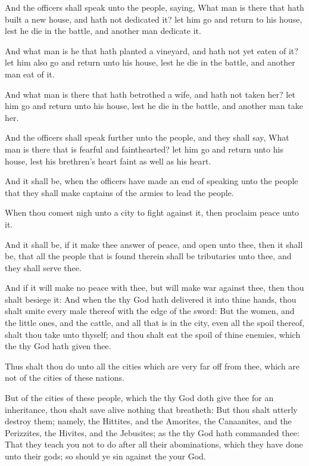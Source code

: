 \Verse And the officers shall speak unto the people, saying, What man is there that hath built a new house, and hath not dedicated it? let him go and return to his house, lest he die in the battle, and another man dedicate it.

\Verse And what man is he that hath planted a vineyard, and hath not yet eaten of it? let him also go and return unto his house, lest he die in the battle, and another man eat of it.

\Verse And what man is there that hath betrothed a wife, and hath not taken her? let him go and return unto his house, lest he die in the battle, and another man take her.

\Verse And the officers shall speak further unto the people, and they shall say, What man is there that is fearful and fainthearted? let him go and return unto his house, lest his brethren's heart faint as well as his heart.

\Verse And it shall be, when the officers have made an end of speaking unto the people that they shall make captains of the armies to lead the people.

\Verse When thou comest nigh unto a city to fight against it, then proclaim peace unto it.

\Verse And it shall be, if it make thee answer of peace, and open unto thee, then it shall be, that all the people that is found therein shall be tributaries unto thee, and they shall serve thee.

\Verse And if it will make no peace with thee, but will make war against thee, then thou shalt besiege it: \Verse And when the \LORD thy God hath delivered it into thine hands, thou shalt smite every male thereof with the edge of the sword: \Verse But the women, and the little ones, and the cattle, and all that is in the city, even all the spoil thereof, shalt thou take unto thyself; and thou shalt eat the spoil of thine enemies, which the \LORD thy God hath given thee.

\Verse Thus shalt thou do unto all the cities which are very far off from thee, which are not of the cities of these nations.

\Verse But of the cities of these people, which the \LORD thy God doth give thee for an inheritance, thou shalt save alive nothing that breatheth: \Verse But thou shalt utterly destroy them; namely, the Hittites, and the Amorites, the Canaanites, and the Perizzites, the Hivites, and the Jebusites; as the \LORD thy God hath commanded thee: \Verse That they teach you not to do after all their abominations, which they have done unto their gods; so should ye sin against the \LORD your God.

